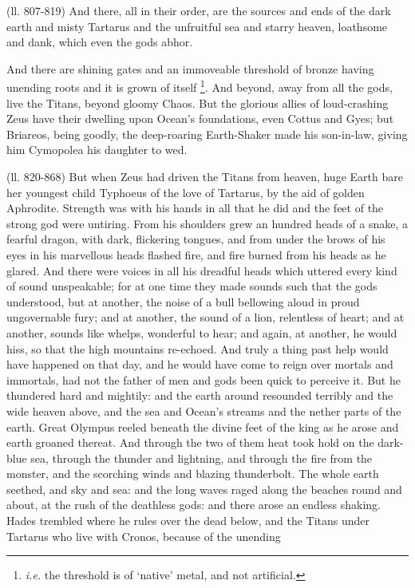 (ll. 807-819) And there, all in their order, are the sources and ends of the
dark earth and misty Tartarus and the unfruitful sea and starry heaven,
loathsome and dank, which even the gods abhor.

And there are shining gates and an immoveable threshold of bronze having
unending roots and it is grown of itself \footnote{\emph{i.e.} the threshold
is of ‘native’ metal, and not artificial.}. And
beyond, away from all the gods, live the Titans, beyond gloomy Chaos. But the
glorious allies of loud-crashing Zeus have their dwelling upon Ocean’s
foundations, even Cottus and Gyes; but Briareos, being goodly, the deep-roaring
Earth-Shaker made his son-in-law, giving him Cymopolea his daughter to wed.

(ll. 820-868) But when Zeus had driven the Titans from heaven, huge Earth bare
her youngest child Typhoeus of the love of Tartarus, by the aid of golden
Aphrodite. Strength was with his hands in all that he did and the feet of the
strong god were untiring. From his shoulders grew an hundred heads of a snake,
a fearful dragon, with dark, flickering tongues, and from under the brows of
his eyes in his marvellous heads flashed fire, and fire burned from his heads
as he glared. And there were voices in all his dreadful heads which uttered
every kind of sound unspeakable; for at one time they made sounds such that the
gods understood, but at another, the noise of a bull bellowing aloud in proud
ungovernable fury; and at another, the sound of a lion, relentless of heart;
and at another, sounds like whelps, wonderful to hear; and again, at another,
he would hiss, so that the high mountains re-echoed. And truly a thing past
help would have happened on that day, and he would have come to reign over
mortals and immortals, had not the father of men and gods been quick to
perceive it. But he thundered hard and mightily: and the earth around resounded
terribly and the wide heaven above, and the sea and Ocean’s streams and
the nether parts of the earth. Great Olympus reeled beneath the divine feet of
the king as he arose and earth groaned thereat. And through the two of them
heat took hold on the dark-blue sea, through the thunder and lightning, and
through the fire from the monster, and the scorching winds and blazing
thunderbolt. The whole earth seethed, and sky and sea: and the long waves raged
along the beaches round and about, at the rush of the deathless gods: and there
arose an endless shaking. Hades trembled where he rules over the dead below,
and the Titans under Tartarus who live with Cronos, because of the unending
